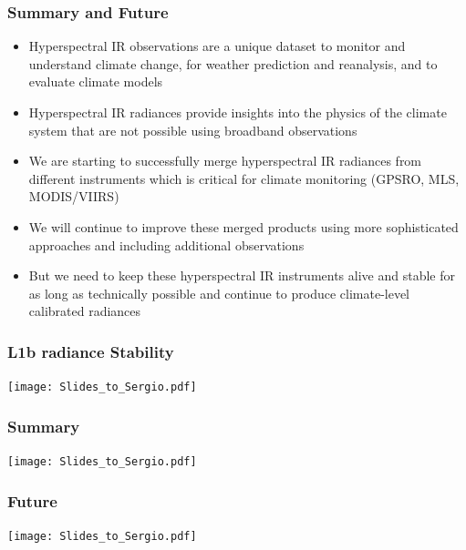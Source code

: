 \documentclass[10pt,t]{beamer}
\begin{document}
\begin{frame}
\frametitle{Summary and Future}  
\begin{itemize}

\item Hyperspectral IR observations are a unique dataset to monitor
  and understand climate change, for weather prediction and
  reanalysis, and to evaluate climate models

\item Hyperspectral IR radiances provide insights into the physics of
  the climate system that are not possible using broadband
  observations

\item We are starting to successfully merge hyperspectral IR radiances
  from different instruments which is critical for climate monitoring
  (GPSRO, MLS, MODIS/VIIRS)

\item We will continue to improve these merged products using more
  sophisticated approaches and including additional observations

\item But we need to keep these hyperspectral IR instruments alive and
  stable for as long as technically possible and continue to produce
  climate-level calibrated radiances

\end{itemize}
\end{frame}
\begin{frame}
\frametitle{L1b radiance Stability}  
\vspace{-0.35in}
\begin{center}
\texttt{[image: Slides\_to\_Sergio.pdf]}
\end{center}
\end{frame}

\begin{frame}
\frametitle{Summary}  
\vspace{-0.35in}
\begin{center}
\texttt{[image: Slides\_to\_Sergio.pdf]}
\end{center}
\end{frame}

\begin{frame}
\frametitle{Future}  
\vspace{-0.35in}
\begin{center}
\texttt{[image: Slides\_to\_Sergio.pdf]}
\end{center}
\end{frame}
\end{document}
